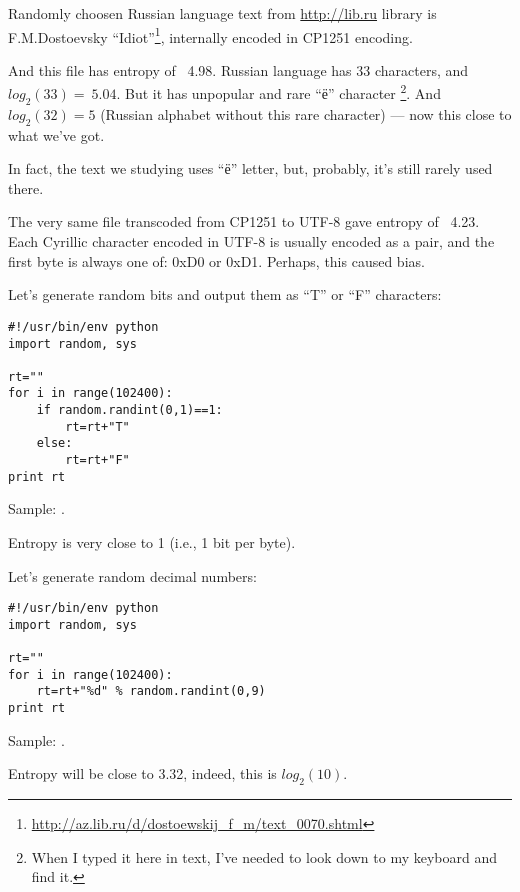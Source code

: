 Randomly choosen Russian language text from \url{http://lib.ru}
library is F.M.Dostoevsky ``Idiot''\footnote{\url{http://az.lib.ru/d/dostoewskij_f_m/text_0070.shtml}},
internally encoded in CP1251 encoding.

And this file has entropy of ~4.98.
Russian language has 33 characters, and $log_2(33)=~5.04$.
But it has unpopular and rare ``ё'' character
\footnote{When I typed it here in text, I've needed to look down to my keyboard and find it.}.
And $log_2(32)=5$ (Russian alphabet without this rare character) --- now this close to what we've got.

In fact, the text we studying uses ``ё'' letter, but, probably, it's still rarely used there.

The very same file transcoded from CP1251 to UTF-8 gave entropy of ~4.23.
Each Cyrillic character encoded in UTF-8 is usually encoded as a pair,
and the first byte is always one of: 0xD0 or 0xD1.
Perhaps, this caused bias.

Let's generate random bits and output them as ``T'' or ``F'' characters:

\begin{lstlisting}
#!/usr/bin/env python
import random, sys

rt=""
for i in range(102400):
    if random.randint(0,1)==1:
        rt=rt+"T"
    else:
        rt=rt+"F"
print rt
\end{lstlisting}

Sample: .

Entropy is very close to 1 (i.e., 1 bit per byte).

Let's generate random decimal numbers:

\begin{lstlisting}
#!/usr/bin/env python
import random, sys

rt=""
for i in range(102400):
    rt=rt+"%d" % random.randint(0,9)
print rt
\end{lstlisting}

Sample: .

Entropy will be close to 3.32, indeed, this is $log_2(10)$.

